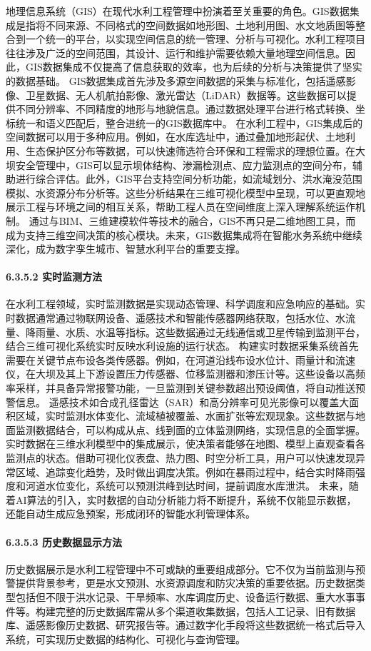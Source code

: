 地理信息系统（GIS）在现代水利工程管理中扮演着至关重要的角色。GIS数据集成是指将不同来源、不同格式的空间数据如地形图、土地利用图、水文地质图等整合到一个统一的平台，以实现空间信息的统一管理、分析与可视化。水利工程项目往往涉及广泛的空间范围，其设计、运行和维护需要依赖大量地理空间信息。因此，GIS数据集成不仅提高了信息获取的效率，也为后续的分析与决策提供了坚实的数据基础。 GIS数据集成首先涉及多源空间数据的采集与标准化，包括遥感影像、卫星数据、无人机航拍影像、激光雷达（LiDAR）数据等。这些数据可以提供不同分辨率、不同精度的地形与地貌信息。通过数据处理平台进行格式转换、坐标统一和语义匹配后，整合进统一的GIS数据库中。 在水利工程中，GIS集成后的空间数据可以用于多种应用。例如，在水库选址中，通过叠加地形起伏、土地利用、生态保护区分布等数据，可以快速筛选符合环保和工程需求的理想位置。在大坝安全管理中，GIS可以显示坝体结构、渗漏检测点、应力监测点的空间分布，辅助进行综合评估。此外，GIS平台支持空间分析功能，如流域划分、洪水淹没范围模拟、水资源分布分析等。这些分析结果在三维可视化模型中呈现，可以更直观地展示工程与环境之间的相互关系，帮助工程人员在空间维度上深入理解系统运作机制。 通过与BIM、三维建模软件等技术的融合，GIS不再只是二维地图工具，而成为支持三维空间决策的核心模块。未来，GIS数据集成将在智能水务系统中继续深化，成为数字孪生城市、智慧水利平台的重要支撑。 \paragraph{6.3.5.2 实时监测方法}\label{ux5b9eux65f6ux76d1ux6d4bux65b9ux6cd5} 在水利工程领域，实时监测数据是实现动态管理、科学调度和应急响应的基础。实时数据通常通过物联网设备、遥感技术和智能传感器网络获取，包括水位、水流量、降雨量、水质、水温等指标。这些数据通过无线通信或卫星传输到监测平台，结合三维可视化系统实时反映水利设施的运行状态。 构建实时数据采集系统首先需要在关键节点布设各类传感器。例如，在河道沿线布设水位计、雨量计和流速仪，在大坝及其上下游设置压力传感器、位移监测器和渗压计等。这些设备以高频率采样，并具备异常报警功能，一旦监测到关键参数超出预设阈值，将自动推送预警信息。 遥感技术如合成孔径雷达（SAR）和高分辨率可见光影像可以覆盖大面积区域，实时监测水体变化、流域植被覆盖、水面扩张等宏观现象。这些数据与地面监测数据结合，可以构成从点、线到面的立体监测网络，实现信息的全面掌握。实时数据在三维水利模型中的集成展示，使决策者能够在地图、模型上直观查看各监测点的状态。借助可视化仪表盘、热力图、时空分析工具，用户可以快速发现异常区域、追踪变化趋势，及时做出调度决策。例如在暴雨过程中，结合实时降雨强度和河道水位变化，系统可以预测洪峰到达时间，提前调度水库泄洪。 未来，随着AI算法的引入，实时数据的自动分析能力将不断提升，系统不仅能显示数据，还能自动生成应急预案，形成闭环的智能水利管理体系。 \paragraph{6.3.5.3 历史数据显示方法}\label{ux5386ux53f2ux6570ux636eux663eux793aux65b9ux6cd5} 历史数据展示是水利工程管理中不可或缺的重要组成部分。它不仅为当前监测与预警提供背景参考，更是水文预测、水资源调度和防灾决策的重要依据。历史数据类型包括但不限于洪水记录、干旱频率、水库调度历史、设备运行数据、重大水事事件等。构建完整的历史数据库需从多个渠道收集数据，包括人工记录、旧有数据库、遥感影像历史数据、研究报告等。通过数字化手段将这些数据统一格式后导入系统，可实现历史数据的结构化、可视化与查询管理。 